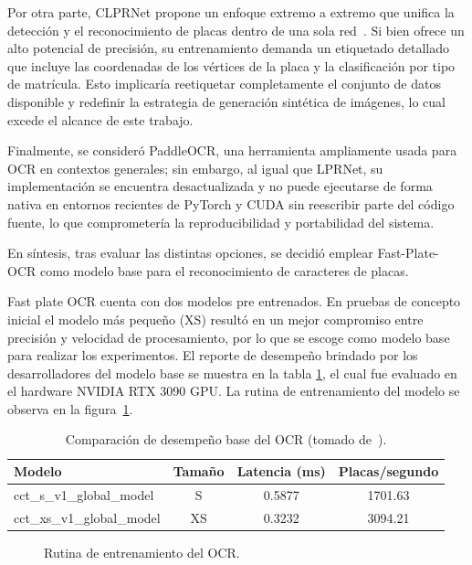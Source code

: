 Por otra parte, CLPRNet propone un enfoque extremo a extremo que unifica la detección 
y el reconocimiento de placas dentro de una sola red~\cite{clprnet-paper}.
Si bien ofrece un alto potencial de precisión, su entrenamiento demanda un etiquetado detallado
que incluye las coordenadas de los vértices de la placa y la clasificación por tipo de matrícula.
Esto implicaría reetiquetar completamente el conjunto de datos disponible y
redefinir la estrategia de generación sintética de imágenes, lo cual excede el alcance de este trabajo.

Finalmente, se consideró PaddleOCR, una herramienta ampliamente usada para OCR
en contextos generales; sin embargo, al igual que LPRNet,
su implementación se encuentra desactualizada y
no puede ejecutarse de forma nativa en entornos recientes de PyTorch y CUDA 
sin reescribir parte del código fuente, lo que comprometería la reproducibilidad y portabilidad del sistema.

En síntesis, tras evaluar las distintas opciones, se decidió emplear Fast-Plate-OCR 
como modelo base para el reconocimiento de caracteres de placas.

Fast plate OCR cuenta con dos modelos pre entrenados. En pruebas de concepto inicial
el modelo más pequeño (XS) resultó en un mejor compromiso entre precisión y velocidad de procesamiento,
por lo que se escoge como modelo base para realizar los experimentos.
El reporte de desempeño brindado por los desarrolladores del modelo base se muestra en la tabla 
\ref{tab:ocr-comparacion-complejidad}, el cual fue evaluado en el hardware NVIDIA RTX 3090 GPU.
La rutina de entrenamiento del modelo se observa en la figura~\ref{fig:entrenamiento-ocr}.

\begin{table}[h]
    \centering
    \begin{tabular}{lccc}
        \toprule
        \textbf{Modelo} & \textbf{Tamaño} & \textbf{Latencia (ms)} & \textbf{Placas/segundo} \\
        \midrule
        cct\_s\_v1\_global\_model  & S  & 0.5877 & 1701.63 \\
        cct\_xs\_v1\_global\_model & XS & 0.3232 & 3094.21 \\
        \bottomrule
    \end{tabular}
    \caption{Comparación de desempeño base del OCR (tomado de~\cite{hassani2021escaping}).}
    \label{tab:ocr-comparacion-complejidad}
\end{table}

\begin{figure}[h]
	\centering
	
	\caption{Rutina de entrenamiento del OCR.}
	\label{fig:entrenamiento-ocr}
\end{figure}

